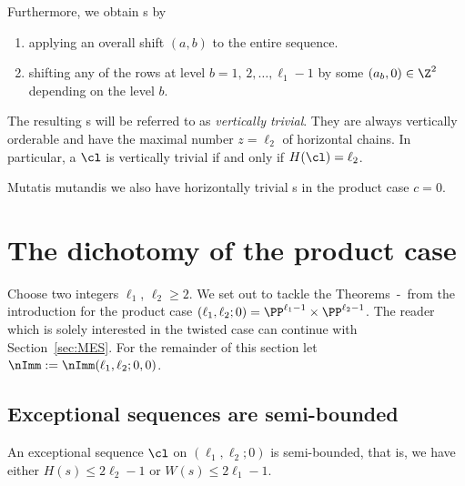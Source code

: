 {Furthermore, we obtain {\mes}s by 
\begin{enumerate}
\item[(i)] applying an overall shift $(a,b)$ 
to the entire sequence.
\vspace{1ex}
\item[(ii)] shifting any of the rows at level 
$b=1,\,2,\ldots,\ell_1-1$ by {some} $(a_b,0)\in\Z^2$ 
depending on the level $b$.
\end{enumerate}
The resulting {\mes}s will be referred to as 
{\em vertically trivial}. They are always
vertically orderable and have the maximal number
$z=\ell_2$ of horizontal chains. In 
particular, a {\mes} $\cl$ is vertically 
trivial if and only if $H(\cl)=\ell_2$.}

Mutatis mutandis we also have horizontally 
trivial {\mes}s in the product case $c=0$.

\section{The dichotomy of the product case}
\label{sec:ProdCase}
Choose two integers $\ell_1$, $\ell_2\geq2$. 
We set out to tackle the Theorems~\thLex-\thFull\ from 
the introduction for the product 
case $(\ell_1,\ell_2;0)=\PP^{\ell_1-1}
\times\PP^{\ell_2-1}$. The reader which
is solely interested in the twisted case
can continue with Section~\ref{sec:MES}.
For the remainder of this section {let}
$\nImm:=\nImm(\ell_1,\ell_2;0,0)$. 

\subsection{Exceptional sequences 
are semi-bounded}
\label{subsec:ThmBProdCase}

\begin{theorem}
\label{thm:SlimPaPb}
An exceptional sequence $\cl$ on 
$(\ell_1,\ell_2;0)$ is semi-bounded, 
that is, we have either $H(s)\leq2\ell_2-1$ 
or $W(s)\leq2\ell_1-1$.
\end{theorem}

